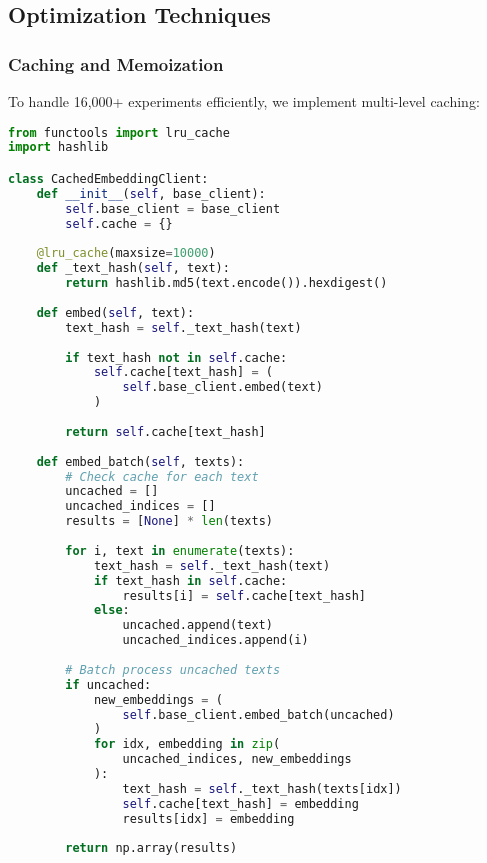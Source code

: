 \documentclass[conference]{IEEEtran}
\begin{document}
\subsection{Optimization Techniques}

\subsubsection{Caching and Memoization}

To handle 16,000+ experiments efficiently, we implement multi-level caching:

\begin{lstlisting}[language=Python, basicstyle=\small]
from functools import lru_cache
import hashlib

class CachedEmbeddingClient:
    def __init__(self, base_client):
        self.base_client = base_client
        self.cache = {}
    
    @lru_cache(maxsize=10000)
    def _text_hash(self, text):
        return hashlib.md5(text.encode()).hexdigest()
    
    def embed(self, text):
        text_hash = self._text_hash(text)
        
        if text_hash not in self.cache:
            self.cache[text_hash] = (
                self.base_client.embed(text)
            )
        
        return self.cache[text_hash]
    
    def embed_batch(self, texts):
        # Check cache for each text
        uncached = []
        uncached_indices = []
        results = [None] * len(texts)
        
        for i, text in enumerate(texts):
            text_hash = self._text_hash(text)
            if text_hash in self.cache:
                results[i] = self.cache[text_hash]
            else:
                uncached.append(text)
                uncached_indices.append(i)
        
        # Batch process uncached texts
        if uncached:
            new_embeddings = (
                self.base_client.embed_batch(uncached)
            )
            for idx, embedding in zip(
                uncached_indices, new_embeddings
            ):
                text_hash = self._text_hash(texts[idx])
                self.cache[text_hash] = embedding
                results[idx] = embedding
        
        return np.array(results)
\end{lstlisting}
\end{document}
